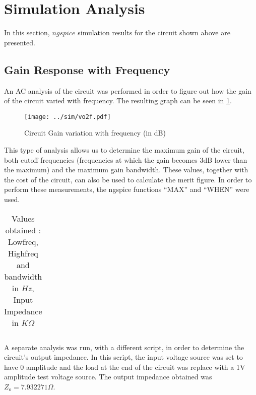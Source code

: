\section{Simulation Analysis}
\label{sec:simulation}

In this section, $ngspice$ simulation results for the circuit shown above are presented.


\subsection{Gain Response with Frequency}

An AC analysis of the circuit was performed in order to figure out how the gain of the circuit varied with frequency. The resulting graph can be seen in \ref{fig:gain_freq}.

\begin{figure}[H] \centering
\texttt{[image: ../sim/vo2f.pdf]}
\caption{Circuit Gain variation with frequency (in dB)}
\label{fig:gain_freq}
\end{figure}

This type of analysis allows us to determine the maximum gain of the circuit, both cutoff frequencies (frequencies at which the gain becomes 3dB lower than the maximum) and the maximum gain bandwidth. These values, together with the cost of the circuit, can also be used to calculate the merit figure. In order to perform these measurements, the ngspice functions ``MAX'' and ``WHEN'' were used.

\begin{table}[H]
  \centering
  \begin{tabular}{|c|c|}
    \hline
      
  \end{tabular}
  \caption{Values obtained : Lowfreq, Highfreq and bandwidth in $Hz$, Input Impedance in $K\Omega$  }
  \label{tab:resultssim}
\end{table}

A separate analysis was run, with a different script, in order to determine the circuit's output impedance. In this script, the input voltage source was set to have 0 amplitude and the load at the end of the circuit was replace with a 1V amplitude test voltage source. The output impedance obtained was $Z_o = 7.932271 \Omega$.





